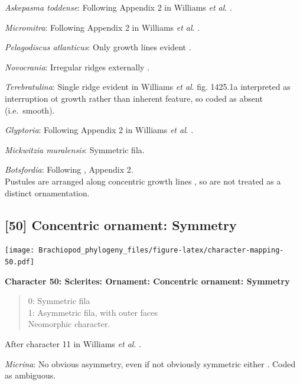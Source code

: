 \documentclass[]{book}
\theoremstyle{definition}
\theoremstyle{definition}
\theoremstyle{definition}
\theoremstyle{remark}
\begin{document}
\emph{Askepasma toddense}: Following Appendix 2 in Williams \emph{et
al}. \citeyearpar{Williams1998Thediversity}.

\emph{Micromitra}: Following Appendix 2 in Williams \emph{et al}.
\citeyearpar{Williams1998Thediversity}.

\emph{Pelagodiscus atlanticus}: Only growth lines evident
\citep{Williams2000BrachiopodaLinguliformea}.

\emph{Novocrania}: Irregular ridges externally
\citep{Williams2000BrachiopodaLinguliformea}.

\emph{Terebratulina}: Single ridge evident in Williams \emph{et al}.
\citeyearpar{Williams2006Rhynchonelliformeapart} fig. 1425.1a
interpreted as interruption ot growth rather than inherent feature, so
coded as absent (i.e.~smooth).

\emph{Glyptoria}: Following Appendix 2 in Williams \emph{et al}.
\citeyearpar{Williams1998Thediversity}.

\emph{Mickwitzia muralensis}: Symmetric fila.

\emph{Botsfordia}: Following \citet{Williams1998Thediversity}, Appendix
2.\\
Pustules are arranged along concentric growth lines
\citep{Skovsted2005EarlyCambrian}, so are not treated as a distinct
ornamentation.

\hypertarget{concentric-ornament-symmetry}{%
\subsection*{{[}50{]} Concentric ornament:
Symmetry}\label{concentric-ornament-symmetry}}

\texttt{[image: Brachiopod\_phylogeny\_files/figure-latex/character-mapping-50.pdf]}

\textbf{Character 50: Sclerites: Ornament: Concentric ornament:
Symmetry}

\begin{quote}
0: Symmetric fila\\
1: Asymmetric fila, with outer faces\\
Neomorphic character.
\end{quote}

After character 11 in Williams \emph{et al}.
\citeyearpar{Williams1998Thediversity}.

\emph{Micrina}: No obvious asymmetry, even if not obviously symmetric
either \citep{Holmer2008TheEarly}. Coded as ambiguous.
\end{document}
